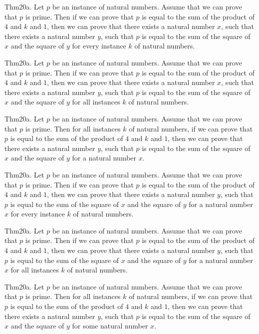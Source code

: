 \documentclass{article}
\begin{document}
Thm20a. Let $p$ be an instance of natural numbers. Assume that we can prove that $p$ is prime. Then if we can prove that $p$ is equal to the sum of the product of $4$ and $k$ and $1$, then we can prove that there exists a natural number $x$, such that there exists a natural number $y$, such that $p$ is equal to the sum of the square of $x$ and the square of $y$ for every instance $k$ of natural numbers.

Thm20a. Let $p$ be an instance of natural numbers. Assume that we can prove that $p$ is prime. Then if we can prove that $p$ is equal to the sum of the product of $4$ and $k$ and $1$, then we can prove that there exists a natural number $x$, such that there exists a natural number $y$, such that $p$ is equal to the sum of the square of $x$ and the square of $y$ for all instances $k$ of natural numbers.

Thm20a. Let $p$ be an instance of natural numbers. Assume that we can prove that $p$ is prime. Then for all instances $k$ of natural numbers, if we can prove that $p$ is equal to the sum of the product of $4$ and $k$ and $1$, then we can prove that there exists a natural number $y$, such that $p$ is equal to the sum of the square of $x$ and the square of $y$ for a natural number $x$.

Thm20a. Let $p$ be an instance of natural numbers. Assume that we can prove that $p$ is prime. Then if we can prove that $p$ is equal to the sum of the product of $4$ and $k$ and $1$, then we can prove that there exists a natural number $y$, such that $p$ is equal to the sum of the square of $x$ and the square of $y$ for a natural number $x$ for every instance $k$ of natural numbers.

Thm20a. Let $p$ be an instance of natural numbers. Assume that we can prove that $p$ is prime. Then if we can prove that $p$ is equal to the sum of the product of $4$ and $k$ and $1$, then we can prove that there exists a natural number $y$, such that $p$ is equal to the sum of the square of $x$ and the square of $y$ for a natural number $x$ for all instances $k$ of natural numbers.

Thm20a. Let $p$ be an instance of natural numbers. Assume that we can prove that $p$ is prime. Then for all instances $k$ of natural numbers, if we can prove that $p$ is equal to the sum of the product of $4$ and $k$ and $1$, then we can prove that there exists a natural number $y$, such that $p$ is equal to the sum of the square of $x$ and the square of $y$ for some natural number $x$.
\end{document}
